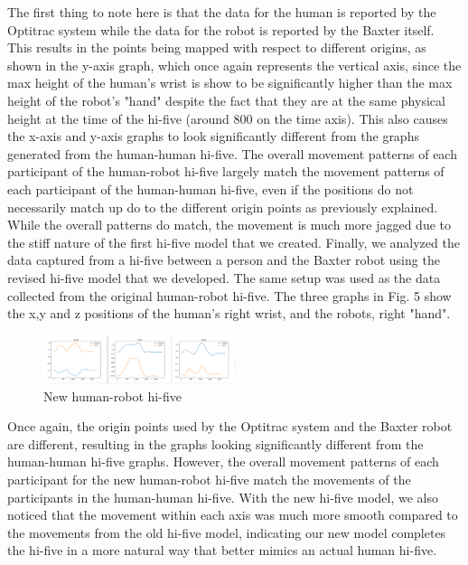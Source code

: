 \documentclass[letterpaper, 10 pt, conference]{ieeeconf}  %
\begin{document}
\newline
\indent The first thing to note here is that the data for the human is reported by the Optitrac system while the data for the robot is reported by the Baxter itself. This results in the points being mapped with respect to different origins, as shown in the y-axis graph, which once again represents the vertical axis, since the max height of the human's wrist is show to be significantly higher than the max height of the robot's "hand" despite the fact that they are at the same physical height at the time of the hi-five (around 800 on the time axis). This also causes the x-axis and y-axis graphs to look significantly different from the graphs generated from the human-human hi-five. 
\newline
\indent The overall movement patterns of each participant of the human-robot hi-five largely match the movement patterns of each participant of the human-human hi-five, even if the positions do not necessarily match up do to the different origin points as previously explained. While the overall patterns do match, the movement is much more jagged due to the stiff nature of the first hi-five model that we created.
\newline
\indent Finally, we analyzed the data captured from a hi-five between a person and the Baxter robot using the revised hi-five model that we developed. The same setup was used as the data collected from the original human-robot hi-five. The three graphs in Fig. 5 show the x,y and z positions of the human's right wrist, and the robots, right "hand".
\begin{figure}[h]
\centering
\includegraphics[width=0.5\textwidth]{newfive.png}
\caption{New human-robot hi-five}
\end{figure}
\newline
\indent Once again, the origin points used by the Optitrac system and the Baxter robot are different, resulting in the graphs looking significantly different from the human-human hi-five graphs. However, the overall movement patterns of each participant for the new human-robot hi-five match the movements of the participants in the human-human hi-five. With the new hi-five model, we also noticed that the movement within each axis was much more smooth compared to the movements from the old hi-five model, indicating our new model completes the hi-five in a more natural way that better mimics an actual human hi-five.
\end{document}
